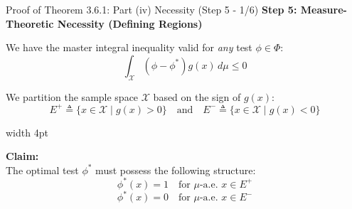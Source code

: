 \documentclass[10pt, aspectratio=169, xcolor=dvipsnames]{beamer}
\newcommand{\lead}[1]{{\color{UniBlue}\bfseries #1}}
\begin{document}
\begin{frame}{Proof of Theorem 3.6.1: Part (iv) Necessity (Step 5 - 1/6)}
    \lead{Step 5: Measure-Theoretic Necessity (Defining Regions)}\\
    \vspace{0.4cm}
    
    We have the master integral inequality valid for \textit{any} test $\phi \in \Phi$:
    \[ \int_{\mathcal{X}} (\phi - \phi^*) g(x) \, d\mu \le 0 \]
    
    \vspace{0.3cm}
    We partition the sample space $\mathcal{X}$ based on the sign of $g(x)$:
    \[ E^+ \triangleq \{ x \in \mathcal{X} \mid g(x) > 0 \} \quad \text{and} \quad E^- \triangleq \{ x \in \mathcal{X} \mid g(x) < 0 \} \]
    
    \vspace{0.4cm}
    \noindent
    {\color{Teal}\vrule width 4pt}%
    \hspace{10pt}%
    \begin{minipage}{\dimexpr\textwidth-14pt\relax}
        \color{Slate}
        \textbf{Claim:}\\
        The optimal test $\phi^*$ must possess the following structure:
        \[ \phi^*(x) = 1 \quad \text{for } \mu\text{-a.e. } x \in E^+ \]
        \[ \phi^*(x) = 0 \quad \text{for } \mu\text{-a.e. } x \in E^- \]
    \end{minipage}
\end{frame}
\end{document}
